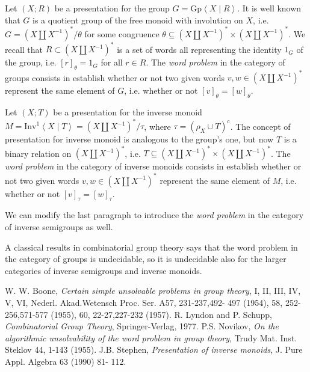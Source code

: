 \documentclass[12pt]{article}
\begin{document}


\newcommand{\e}{\mathrm{e}}
\newcommand{\co}{\mathrm{c}}

\newcommand{\cbra}[1]{\left( #1 \right)}
\newcommand{\qbra}[1]{\left[ #1 \right]}
\newcommand{\gbra}[1]{\left\{ #1 \right\}}
\newcommand{\abra}[1]{\left\langle #1 \right\rangle}

\newcommand{\gpres}[2]{\mathrm{Gp}\abra{#1 \mid #2}}
\newcommand{\mipres}[2]{\mathrm{Inv}^1\abra{#1 \mid #2}}
\newcommand{\sipres}[2]{\mathrm{Inv}\abra{#1 \mid #2}}

\newcommand{\double}[1]{\cbra{#1\amalg #1^{-1}}}
\newcommand{\doubles}[1]{\cbra{#1\amalg #1^{-1}}^\ast}
\newcommand{\doublep}[1]{\cbra{#1\amalg #1^{-1}}^+}
\newcommand{\fim}{\mathrm{FIM}}
\newcommand{\fis}{\mathrm{FIS}}
\newcommand{\fg}{\mathrm{FG}}

Let $(X;R)$ be a presentation for the group $G=\gpres{X}{R}$. It is well known that $G$ is a quotient group of the free monoid with involution on $X$, i.e.  $G=\doubles X/\theta$ for some congruence $\theta\subseteq \doubles X\times \doubles X$.  We recall that $R\subset \doubles X$ is a set of words all representing the identity $1_G$ of the group, i.e. $[r]_\theta=1_G$ for all $r\in R$. The \emph{word problem} in the category of groups consists in establish whether or not two given words $v,w\in\doubles X$ represent the same element of $G$, i.e. whether or not $[v]_\theta=[w]_\theta$.

Let $(X;T)$ be a presentation for the inverse monoid $M=\mipres{X}{T}=\doubles X/\tau$, where $\tau=(\rho_X\cup T)^\co$. The concept of presentation for inverse monoid is analogous to the group's one, but now $T$ is a binary relation on $\doubles X$, i.e. $T\subseteq\doubles X\times\doubles X$. 
The \emph{word problem} in the category of inverse monoids consists in establish whether or not two given words $v,w\in\doubles X$ represent the same element of $M$, i.e. whether or not $[v]_\tau=[w]_\tau$.

We can modify the last paragraph to introduce the \emph{word problem} in the category of inverse semigroups as well.

A classical results in combinatorial group theory says that the word problem in the category of groups is undecidable, so it is  undecidable also for the larger categories of inverse semigroups and inverse monoids.


\begin{thebibliography}{9}
 W. W. Boone, \emph{Certain simple unsolvable problems in group theory}, I, II, III,
IV, V, VI, Nederl. Akad.Wetensch Proc. Ser. A57, 231-237,492- 497 (1954), 58,
252-256,571-577 (1955), 60, 22-27,227-232 (1957).
 R. Lyndon and P. Schupp, \emph{Combinatorial Group Theory}, Springer-Verlag, 1977.
 P.S. Novikov, \emph{On the algorithmic unsolvability of the word problem in group theory},
Trudy Mat. Inst. Steklov 44, 1-143 (1955).
 J.B. Stephen, \emph{Presentation of inverse monoids}, J. Pure Appl. Algebra 63 (1990) 81-
112.
\end{thebibliography}




\end{document}
